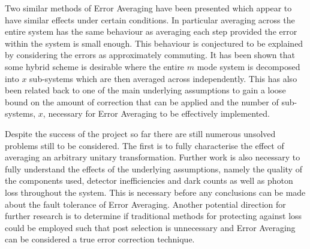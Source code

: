 \documentclass[aps,pra,twocolumn,superscriptaddress,numerical,floatfix]{revtex4-1}
\begin{document}
Two similar methods of Error Averaging have been presented which appear to have similar effects under certain conditions. In particular averaging across the entire system has the same behaviour as averaging each step provided the error within the system is small enough. This behaviour is conjectured to be explained by considering the errors as approximately commuting. It has been shown that some hybrid scheme is desirable where the entire $m$ mode system is decomposed into $x$ sub-systems which are then averaged across independently. This has also been related back to one of the main underlying assumptions to gain a loose bound on the amount of correction that can be applied and the number of sub-systems, $x$, necessary for Error Averaging to be effectively implemented.

Despite the success of the project so far there are still numerous unsolved problems still to be considered. The first is to fully characterise the effect of averaging an arbitrary unitary transformation. Further work is also necessary to fully understand the effects of the underlying assumptions, namely the quality of the components used, detector inefficiencies and dark counts as well as photon loss throughout the system. This is necessary before any conclusions can be made about the fault tolerance of Error Averaging. Another potential direction for further research is to determine if traditional methods for protecting against loss \cite{LossCorrectionTim,LossCorrection}  could be employed such that post selection is unnecessary and Error Averaging can be considered a true error correction technique.


\end{document}
